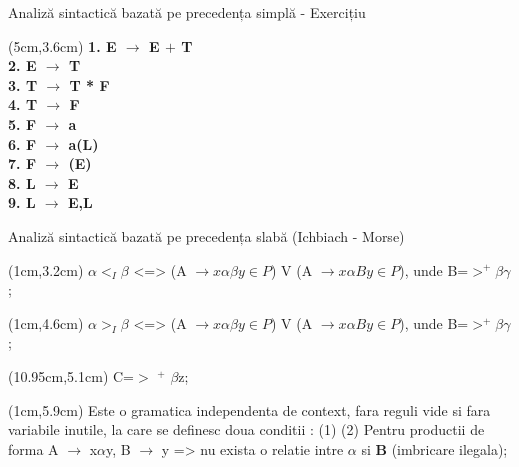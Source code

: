 \documentclass[pdf]{beamer}
\begin{document}
\begin{frame}{Analiză sintactică bazată pe precedența simplă - Exercițiu}    
    \begin{textblock*}{14cm}(5cm,3.6cm)
    \textbf{1. E $\rightarrow$ E $+$ T}\\
    \textbf{2. E $\to$ T}\\
    \textbf{3. T $\to$ T * F}\\
    \textbf{4. T $\to$ F}\\
    \textbf{5. F $\to$ a}\\
    \textbf{6. F $\to$ a(L)}\\
    \textbf{7. F $\to$ (E)}\\
    \textbf{8. L $\to$ E}\\
    \textbf{9. L $\to$ E,L}
    \end{textblock*}
\end{frame}



\begin{frame}
{Analiză sintactică bazată pe precedența slabă (Ichbiach - Morse)}

\begin{textblock*}{14.8cm}(1cm,3.2cm)
\color{black}{ $\beta \in \Sigma$ }
\color{black}{ (1)} \color{red} $\alpha <_{I} \beta$ \color{black} <=> \color{blue} (A $\rightarrow x \alpha \beta y \in P$) V (A $\rightarrow  x  \alpha By \in P$), unde B=$>^+\beta\gamma${;}  
\end{textblock*}

\begin{textblock*}{14.8cm}(1cm,4.6cm)
\color{black}{ (2)} \color{red} $\alpha >_{I} \beta$ \color{black} <=> \color{blue} (A $\rightarrow x \alpha \beta y \in P$) V (A $\rightarrow x \alpha By \in P$), unde B=$>^+\beta\gamma${;}  
\end{textblock*}

\begin{textblock*}{14.8cm}(10.95cm,5.1cm)
 C=$>$ $^+$ $\beta$z; 
\end{textblock*}

\begin{textblock*}{16.8cm}(1cm,5.9cm)
\color{black} Este o gramatica independenta de context, fara reguli vide si fara  variabile inutile, la care se definesc doua conditii :
(1) 
\color{black} (2) Pentru productii de forma \color{blue} A $\rightarrow$ x$\alpha$y, B $\rightarrow$ y \color{black} =>  nu exista o relatie intre \color{red} {$\alpha$} \color{black} si \color{red}\textbf B
 \color{red} {(imbricare ilegala)}\color{black};
\end{textblock*}
\end{frame}
\end{document}
